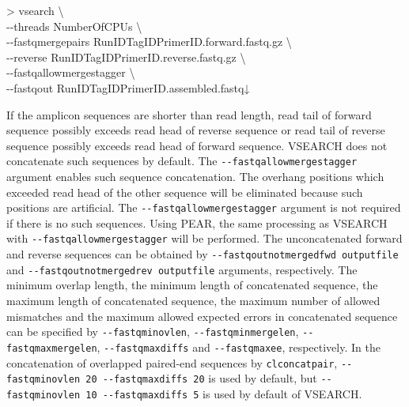 \documentclass[titlepage,10pt,a4paper,english]{jsbook}
\newenvironment{cmd}{\begin{oframed}\raggedright\ttfamily\footnotesize\setlength{\baselineskip}{1.4em}}{\end{oframed}\vspace{-1em}}
\begin{document}
\begin{cmd}
{\textgreater} vsearch {\textbackslash}\\
{-}{-}threads NumberOfCPUs {\textbackslash}\\
{-}{-}fastq{\textunderscore}mergepairs RunID{\textunderscore}{\textunderscore}TagID{\textunderscore}{\textunderscore}PrimerID.forward.fastq.gz {\textbackslash}\\
{-}{-}reverse RunID{\textunderscore}{\textunderscore}TagID{\textunderscore}{\textunderscore}PrimerID.reverse.fastq.gz {\textbackslash}\\
{-}{-}fastq{\textunderscore}allowmergestagger {\textbackslash}\\
{-}{-}fastqout RunID{\textunderscore}{\textunderscore}TagID{\textunderscore}{\textunderscore}PrimerID.assembled.fastq↓
\end{cmd}

If the amplicon sequences are shorter than read length, read tail of forward sequence possibly exceeds read head of reverse sequence or read tail of reverse sequence possibly exceeds read head of forward sequence.
VSEARCH does not concatenate such sequences by default.
The \texttt{{-}{-}fastq{\textunderscore}allowmergestagger} argument enables such sequence concatenation.
The overhang positions which exceeded read head of the other sequence will be eliminated because such positions are artificial.
The \texttt{{-}{-}fastq{\textunderscore}allowmergestagger} argument is not required if there is no such sequences.
Using PEAR, the same processing as VSEARCH with \texttt{{-}{-}fastq{\textunderscore}allowmergestagger} will be performed.
The unconcatenated forward and reverse sequences can be obtained by \texttt{{-}{-}fastqout{\textunderscore}notmerged{\textunderscore}fwd outputfile} and \texttt{{-}{-}fastqout{\textunderscore}notmerged{\textunderscore}rev outputfile} arguments, respectively.
The minimum overlap length, the minimum length of concatenated sequence, the maximum length of concatenated sequence, the maximum number of allowed mismatches and the maximum allowed expected errors in concatenated sequence can be specified by \texttt{{-}{-}fastq{\textunderscore}minovlen}, \texttt{{-}{-}fastq{\textunderscore}minmergelen}, \texttt{{-}{-}fastq{\textunderscore}maxmergelen}, \texttt{{-}{-}fastq{\textunderscore}maxdiffs} and \texttt{{-}{-}fastq{\textunderscore}maxee}, respectively.
In the concatenation of overlapped paired-end sequences by \texttt{clconcatpair}, \texttt{{-}{-}fastq{\textunderscore}minovlen 20 {-}{-}fastq{\textunderscore}maxdiffs 20} is used by default, but \texttt{{-}{-}fastq{\textunderscore}minovlen 10 {-}{-}fastq{\textunderscore}maxdiffs 5} is used by default of VSEARCH.
\end{document}
